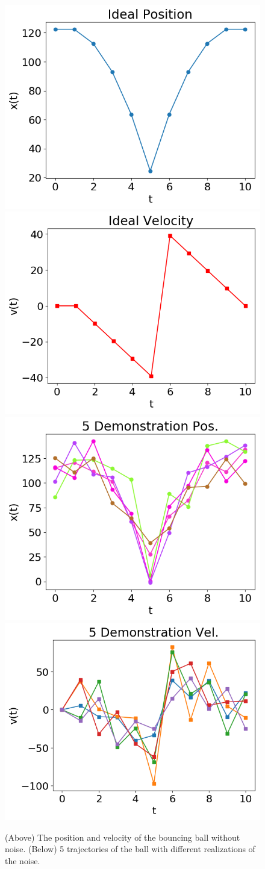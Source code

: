 \begin{figure}%
\centering
\includegraphics[width=0.48\columnwidth]{tsc-experiments/a.png}
\includegraphics[width=0.48\columnwidth]{tsc-experiments/b.png}
\includegraphics[width=0.48\columnwidth]{tsc-experiments/c.png}
\includegraphics[width=0.48\columnwidth]{tsc-experiments/d.png}
\caption{(Above) The position and velocity of the bouncing ball without noise. (Below) 5 trajectories of the ball with different realizations of the noise. \label{ball-diagram}}
\end{figure}

